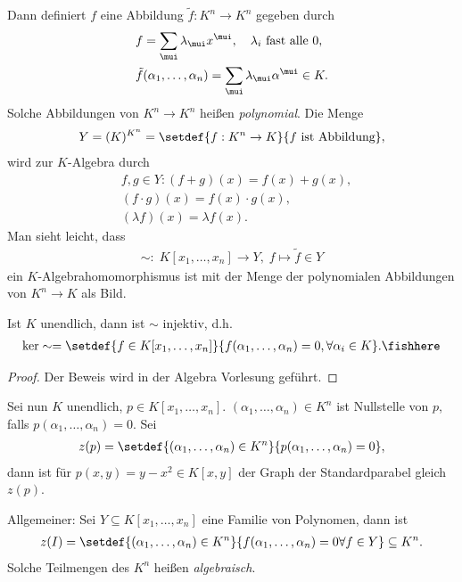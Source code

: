 \begin{bsp}
\begin{enumerate}[label=\arabic{*}.]
Dann definiert $f$ eine Abbildung $\tilde{f} : K^n\to K^n$ gegeben durch
\begin{align*}
&f = \sum_{\mui} \lambda_{\mui} x^{\mui},\quad \lambda_i \text{ fast alle 0},\\
&\tilde{f}(\alpha_1, \ldots,\alpha_n) = \sum_{\mui} \lambda_{\mui}
\alpha^{\mui} \in K.
\end{align*}
Solche Abbildungen von $K^n\to K^n$ heißen \emph{polynomial}. Die Menge
\begin{align*}
Y = (K)^{K^n} = \setdef{f:K^n\to K}{f \text{ ist Abbildung}},
\end{align*}
wird zur $K$-Algebra durch
\begin{align*}
&f,g\in Y : (f+g)(x) = f(x)+g(x),\\
&(f\cdot g)(x) = f(x)\cdot g(x),\\
&(\lambda f)(x) = \lambda f(x). 
\end{align*}
Man sieht leicht, dass
\begin{align*}
\sim :\;K[x_1, \ldots, x_n] \to Y,\;f\mapsto
\tilde{f}\in Y
\end{align*}
ein $K$-Algebrahomomorphismus ist mit der Menge der
polynomialen Abbildungen von $K^n\to K$ als Bild.
\begin{propn}[Behauptung]
Ist $K$ unendlich, dann ist $\sim$ injektiv, d.h.
\begin{align*}
\ker \sim = \setdef{f\in
K[x_1, \ldots, x_n]}{f(\alpha_1, \ldots, \alpha_n) = 0, \forall \alpha_i \in
K}.\fishhere
\end{align*}
\end{propn}
\begin{proof}
Der Beweis wird in der Algebra Vorlesung geführt.\qedhere
\end{proof}

Sei nun $K$ unendlich, $p\in K[x_1,\ldots,x_n]$. $(\alpha_1,\ldots,\alpha_n)\in
K^n$ ist Nullstelle von $p$, falls $p(\alpha_1,\ldots,\alpha_n) = 0$. Sei
\begin{align*}
z(p) = \setdef{(\alpha_1,\ldots,\alpha_n)\in
K^n}{p(\alpha_1,\ldots,\alpha_n) = 0},
\end{align*}
dann ist für $p(x,y) = y-x^2\in K[x,y]$ der Graph der Standardparabel gleich
$z(p)$.

Allgemeiner: Sei $Y \subseteq K[x_1,\ldots,x_n]$ eine Familie von Polynomen,
dann ist
\begin{align*}
z(I) = \setdef{(\alpha_1, \ldots, \alpha_n)\in K^n}{f(\alpha_1,\ldots,\alpha_n)
= 0 \forall f\in Y}\subseteq K^n.
\end{align*}
Solche Teilmengen des $K^n$ heißen \emph{algebraisch}.


\end{enumerate}
\end{bsp}
